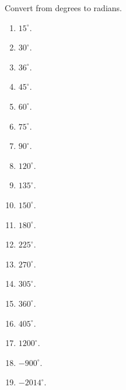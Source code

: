 Convert from degrees to radians.
\begin{multicols}{3}
\begin{enumerate}
\item $15^\circ$.

\item $30^\circ$.

\item $36^\circ$.

\item $45^\circ$.

\item $60^\circ$.

\item $75^\circ$.

\item $90^\circ$.

\item $120^\circ$.

\item $135^\circ$.

\item $150^\circ$.

\item $180^\circ$.

\answer{$\pi$}
\item $225^\circ$.

\item $270^\circ$.

\item $305^\circ$.

\item $360^\circ$.

\answer{$2\pi$}
\item $405^\circ$.

\item $1200^\circ$.

\item $-900^\circ$.

\answer{$-5\pi$}
\item $-2014^\circ$.

\end{enumerate}
\end{multicols}
